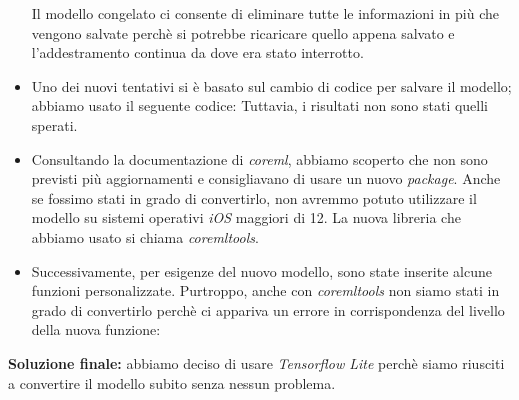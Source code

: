\begin{itemize}
	\newline
	Il modello congelato ci consente di eliminare tutte le informazioni in più che vengono salvate perchè si potrebbe ricaricare quello appena salvato e l'addestramento continua da dove era stato interrotto.
	\vspace*{2ex}
	\vspace*{2ex}
	\item Uno dei nuovi tentativi si è basato sul cambio di codice per salvare il modello; abbiamo usato il seguente codice:
	\vspace*{2ex}
	\vspace*{2ex}
	Tuttavia, i risultati non sono stati quelli sperati.
	
	\item Consultando la documentazione di \textit{coreml}, abbiamo scoperto che non sono previsti più aggiornamenti e consigliavano di usare un nuovo \textit{package}. Anche se fossimo stati in grado di convertirlo, non avremmo potuto utilizzare il modello su sistemi operativi \textit{iOS} maggiori di 12. La nuova libreria che abbiamo usato si chiama \textit{coremltools}.
	\vspace*{2ex}
	\vspace*{2ex}
	\item Successivamente, per esigenze del nuovo modello, sono state inserite alcune funzioni personalizzate. Purtroppo, anche con \textit{coremltools} non siamo stati in grado di convertirlo perchè ci appariva un errore in corrispondenza del livello della nuova funzione:
	\vspace*{2ex}
	\vspace*{2ex}
	
\end{itemize}
\textbf{Soluzione finale:} abbiamo deciso di usare \textit{Tensorflow Lite} perchè siamo riusciti a convertire il modello subito senza nessun problema.


